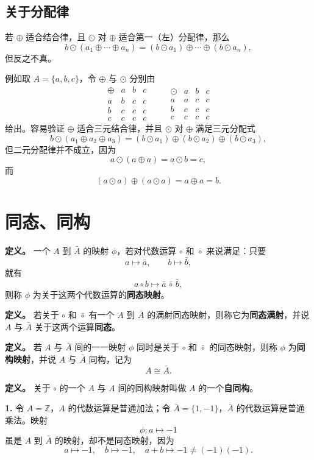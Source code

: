 \subsection*{关于分配律}

若 $\oplus$ 适合结合律，且 $\odot$ 对 $\oplus$ 适合第一（左）分配律，那么
\[
b\odot(a_1\oplus\cdots\oplus a_n)
=(b\odot a_1)\oplus\cdots\oplus(b\odot a_n),
\]
但反之不真。

例如取 $A=\{a,b,c\}$，令 $\oplus$ 与 $\odot$ 分别由
\[
\begin{array}{c|ccc}
\oplus&a&b&c\\\hline
 a&b&c&c\\
 b&c&c&c\\
 c&c&c&c
\end{array}
\qquad
\begin{array}{c|ccc}
\odot&a&b&c\\\hline
 a&a&c&c\\
 b&c&c&c\\
 c&c&c&c
\end{array}
\]
给出。容易验证 $\oplus$ 适合三元结合律，并且 $\odot$ 对 $\oplus$ 满足三元分配式
\[
b\odot(a_1\oplus a_2\oplus a_3)
=(b\odot a_1)\oplus(b\odot a_2)\oplus(b\odot a_3),
\]
但二元分配律并不成立，因为
\[
a\odot(a\oplus a)=a\odot b=c,
\]
而
\[
(a\odot a)\oplus(a\odot a)=a\oplus a=b.
\]

\section{同态、同构}

\textbf{定义。} 一个 $A$ 到 $\bar A$ 的映射 $\phi$，若对代数运算 $\circ$ 和 $\bar\circ$ 来说满足：只要
\[
a\longmapsto\bar a,
\qquad b\longmapsto\bar b,
\]
就有
\[
a\circ b\longmapsto\bar a\,\bar\circ\,\bar b,
\]
则称 $\phi$ 为关于这两个代数运算的\textbf{同态映射}。

\textbf{定义。} 若关于 $\circ$ 和 $\bar\circ$ 有一个 $A$ 到 $\bar A$ 的满射同态映射，则称它为\textbf{同态满射}，并说 $A$ 与 $\bar A$ 关于这两个运算\textbf{同态}。

\textbf{定义。} 若 $A$ 与 $\bar A$ 间的一一映射 $\phi$ 同时是关于 $\circ$ 和 $\bar\circ$ 的同态映射，则称 $\phi$ 为\textbf{同构映射}，并说 $A$ 与 $\bar A$ 同构，记为
\[
A\cong\bar A.
\]

\textbf{定义。} 关于 $\circ$ 的一个 $A$ 与 $A$ 间的同构映射叫做 $A$ 的一个\textbf{自同构}。

\textbf{1.} 令 $A=\mathbb Z$，$A$ 的代数运算是普通加法；令 $\bar A=\{1,-1\}$，$\bar A$ 的代数运算是普通乘法。映射
\[
\phi:a\longmapsto-1
\]
虽是 $A$ 到 $\bar A$ 的映射，却不是同态映射，因为
\[
a\mapsto-1,
\quad b\mapsto-1,
\quad a+b\mapsto-1\ne(-1)(-1).
\]


